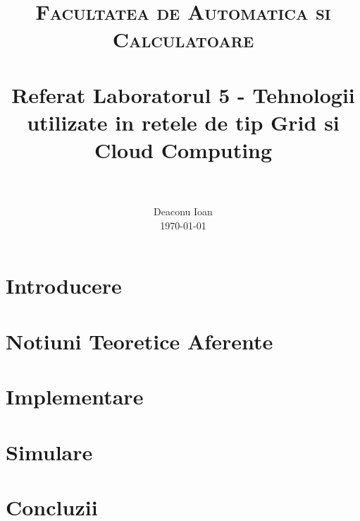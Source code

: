 \documentclass[paper=a4, fontsize=11pt]{scrartcl}
\title{
		\usefont{OT1}{bch}{b}{n}
		\normalfont \normalsize \textsc{Facultatea de Automatica si Calculatoare} \\ [25pt]
		\horrule{0.5pt} \\[0.4cm]
		\huge Referat Laboratorul 5 - Tehnologii utilizate in retele de tip Grid si Cloud
        Computing\\
		\horrule{2pt} \\[0.5cm]
}
\author{
		\normalfont 								\normalsize
        Deaconu Ioan\\[-3pt]		\normalsize
        \today
}
\date{}
\numberwithin{equation}{section}		%
\numberwithin{figure}{section}			%
\numberwithin{table}{section}				%
\begin{document}
 
\maketitle

\section{Introducere}
\label{sec:introducere}


\section{Notiuni Teoretice Aferente}
\label{sec:notiuniteoretice}


\section{Implementare}
\label{sec:implementare}


\section{Simulare} 
\label{sec:simulare}


\section{Concluzii} 
\label{sec:concluzii}




\end{document}
